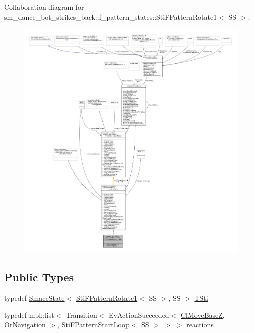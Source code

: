 Collaboration diagram for sm\+\_\+dance\+\_\+bot\+\_\+strikes\+\_\+back\+:\+:f\+\_\+pattern\+\_\+states\+:\+:Sti\+F\+Pattern\+Rotate1$<$ SS $>$\+:
\nopagebreak
\begin{figure}[H]
\begin{center}
\leavevmode
\includegraphics[width=350pt]{structsm__dance__bot__strikes__back_1_1f__pattern__states_1_1StiFPatternRotate1__coll__graph}
\end{center}
\end{figure}
\subsection*{Public Types}
\begin{DoxyCompactItemize}
\item 
typedef \hyperlink{classSmaccState}{Smacc\+State}$<$ \hyperlink{structsm__dance__bot__strikes__back_1_1f__pattern__states_1_1StiFPatternRotate1}{Sti\+F\+Pattern\+Rotate1}$<$ SS $>$, SS $>$ \hyperlink{structsm__dance__bot__strikes__back_1_1f__pattern__states_1_1StiFPatternRotate1_ac35c904f7bbee9538b86251490407684}{T\+Sti}
\item 
typedef mpl\+::list$<$ Transition$<$ Ev\+Action\+Succeeded$<$ \hyperlink{classcl__move__base__z_1_1ClMoveBaseZ}{Cl\+Move\+BaseZ}, \hyperlink{classsm__dance__bot__strikes__back_1_1OrNavigation}{Or\+Navigation} $>$, \hyperlink{structsm__dance__bot__strikes__back_1_1f__pattern__states_1_1StiFPatternStartLoop}{Sti\+F\+Pattern\+Start\+Loop}$<$ SS $>$ $>$ $>$ \hyperlink{structsm__dance__bot__strikes__back_1_1f__pattern__states_1_1StiFPatternRotate1_aba05d27680e46c9e1c82162fef32ad32}{reactions}
\end{DoxyCompactItemize}
